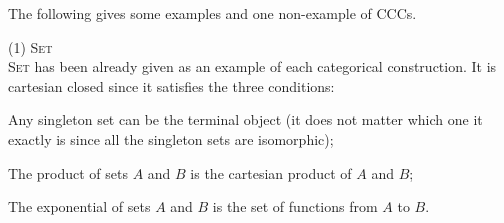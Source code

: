 The following gives some examples and one non-example of CCCs.
\begin{myitemize}
\item[(1)] \textsc{Set}\\
\textsc{Set} has been already given as an example of each categorical construction. It is cartesian closed since it satisfies the three conditions:
  \begin{myitemize}
  \item Any singleton set can be the terminal object (it does not matter which one it exactly is since all the singleton sets are isomorphic);
  \item The product of sets $ A $ and $ B $ is the cartesian product of $ A $ and $ B $;
  \item The exponential of sets $ A $ and $ B $ is the set of functions from $ A $ to $ B $.
  \end{myitemize}
  

\end{myitemize}
